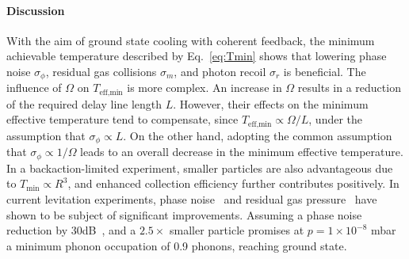 \documentclass[reprint,aps,prl,superscriptaddress]{revtex4-2}
\begin{document}
\paragraph{Discussion} %
With the aim of ground state cooling with coherent feedback, the minimum achievable temperature  described by Eq.~\ref{eq:Tmin} shows that lowering phase noise $\sigma_\phi$, residual gas collisions $\sigma_m$, and photon recoil $\sigma_r$ is beneficial. %
The influence of $\Omega$ on $T_{\text{eff,min}}$ is more complex. An increase in $\Omega$ results in a reduction of the required delay line length $L$. However, their effects on the minimum effective temperature tend to compensate, since $T_{\text{eff,min}} \propto \Omega / L$, under the assumption that $\sigma_\phi \propto L$. On the other hand, adopting the common assumption that $\sigma_\phi \propto 1/\Omega$ leads to an overall decrease in the minimum effective temperature.
In a backaction-limited experiment, smaller particles are also advantageous due to $T_\text{min} \propto R^3$, and enhanced collection efficiency further contributes positively.
In current levitation experiments, phase noise~\cite{kamba2021recoil, dania2024high} and residual gas pressure~\cite{magrini2021real, Dania2024-ultrahigh-quality-levitated, Lindner2024-hollow-core-ultra-high-vacuum} have shown to be subject of significant improvements. Assuming a phase noise reduction by 30dB~\cite{chao2025robust,parniak2021high}, and a $2.5\times$ smaller particle promises at  $p=1\times 10^{-8}$ mbar~\cite{magrini2021real,Dania2024-ultrahigh-quality-levitated} a minimum phonon occupation of 0.9 phonons, reaching ground state.



\end{document}
